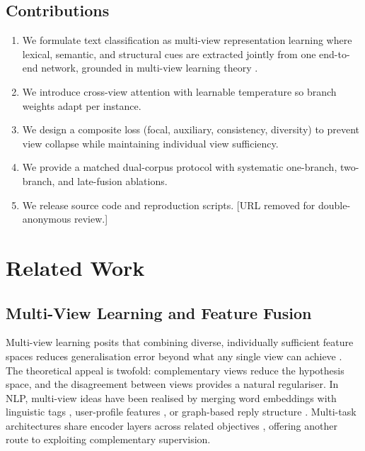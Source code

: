 \documentclass[10pt,twocolumn,a4paper]{article}
\begin{document}
\subsection{Contributions}\label{subsec:contributions}

\begin{enumerate}
\item We formulate text classification as multi-view representation learning where lexical, semantic, and structural cues are extracted jointly from one end-to-end network, grounded in multi-view learning theory \citep{ref19}.
\item We introduce cross-view attention with learnable temperature so branch weights adapt per instance.
\item We design a composite loss (focal, auxiliary, consistency, diversity) to prevent view collapse while maintaining individual view sufficiency.
\item We provide a matched dual-corpus protocol with systematic one-branch, two-branch, and late-fusion ablations.
\item We release source code and reproduction scripts. [URL removed for double-anonymous review.]
\end{enumerate}

\section{Related Work}\label{sec:related}

\subsection{Multi-View Learning and Feature Fusion}\label{subsec:multiview}

Multi-view learning posits that combining diverse, individually sufficient feature spaces reduces generalisation error beyond what any single view can achieve \citep{ref19}. The theoretical appeal is twofold: complementary views reduce the hypothesis space, and the disagreement between views provides a natural regulariser. In NLP, multi-view ideas have been realised by merging word embeddings with linguistic tags \citep{ref21}, user-profile features \citep{ref22}, or graph-based reply structure \citep{ref17}. Multi-task architectures share encoder layers across related objectives \citep{ref20}, offering another route to exploiting complementary supervision.
\end{document}
